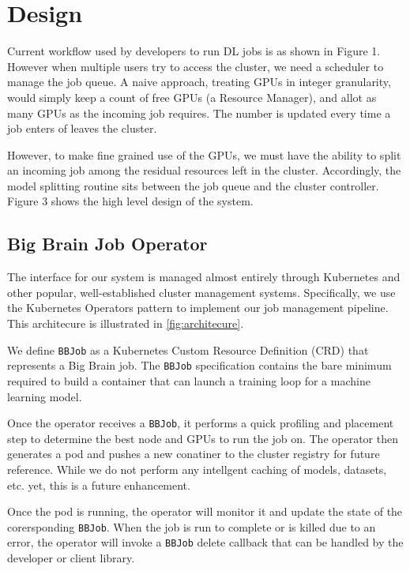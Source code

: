 \section{Design}
\label{sec:design}


Current workflow used by developers to run DL jobs is as shown in Figure 1.
However when multiple users try to access the cluster, we need a scheduler to
manage the job queue. A naive approach, treating GPUs in integer granularity,
would simply keep a count of free GPUs (a Resource Manager), and allot as many
GPUs as the incoming job requires. The number is updated every time a job enters
of leaves the cluster. 

However, to make fine grained use of the GPUs, we must have the ability to split
an incoming job among the residual resources left in the cluster. Accordingly,
the model splitting routine sits between the job queue and the cluster
controller. Figure 3 shows the high level design of the system.

\subsection{Big Brain Job Operator}

The interface for our system is managed almost entirely through Kubernetes and
other popular, well-established cluster management systems. Specifically, we use
the Kubernetes Operators pattern to implement our job management pipeline. This
architecure is illustrated in \ref{fig:architecure}.


We define \texttt{BBJob} as a Kubernetes Custom Resource Definition (CRD) that represents a
Big Brain job. The \texttt{BBJob} specification contains the bare minimum
required to build a container that can launch a training loop for a machine
learning model.

Once the operator receives a \texttt{BBJob}, it performs a quick profiling and
placement step to determine the best node and GPUs to run the job on. The
operator then generates a pod and pushes a new conatiner to the cluster registry
for future reference. While we do not perform any intellgent caching of models,
datasets, etc. yet, this is a future enhancement.

Once the pod is running, the operator will monitor it and update the state of
the corersponding \texttt{BBJob}. When the job is run to complete or is killed
due to an error, the operator will invoke a \texttt{BBJob} delete callback that
can be handled by the developer or client library. 

